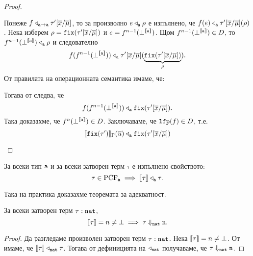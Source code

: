 \begin{proof}
\begin{itemize}
    Понеже $f \triangleleft_{\vv{a}\to\vv{a}} \tau'[\ov{x}/\ov{\mu}]$, то
    за произволно $e \triangleleft_{\vv{a}} \rho$ е изпълнено, че
    $f(e) \triangleleft_{\vv{a}} \tau'[\ov{x}/\ov{\mu}](\rho)$.
    Нека изберем $\rho = \fix(\tau'[\ov{x}/\ov{\mu}])$ и $e = f^{n-1}(\bot^{\val{\vv{a}}})$.
    Щом $f^{n-1}(\bot^{\val{\vv{a}}}) \in D$, то $f^{n-1}(\bot^{\val{\vv{a}}}) \triangleleft_{\vv{a}} \rho$ и следователно
    \[f(f^{n-1}(\bot^{\val{\vv{a}}})) \triangleleft_{\vv{a}} \tau'[\ov{x}/\ov{\mu}](\underbrace{\fix(\tau'[\ov{x}/\ov{\mu}])}_{\rho}).\]
    От правилата на операционната семантика имаме, че:
    \begin{prooftree}
    \end{prooftree}
    Тогава от  следва, че
    \[f(f^{n-1}(\bot^{\val{\vv{a}}})) \triangleleft_{\vv{a}} \fix(\tau'[\ov{x}/\ov{\mu}]).\]
    Така доказахме, че $f^n(\bot^{\val{\vv{a}}}) \in D$.
    Заключаваме, че $\lfp(f) \in D$, т.е.
    \[\val{\fix(\tau')}_\Gamma(\ov{u}) \triangleleft_{\vv{a}} \fix(\tau'[\ov{x}/\ov{\mu}])\]
  \end{itemize}
\end{proof}

\begin{corollary}\label{cr:pcf:fundamental}
  За всеки тип $\vv{a}$ и за всеки затворен терм $\tau$ е изпълнено свойството:
  \[\tau \in \text{PCF}_{\vv{a}} \implies \val{\tau} \triangleleft_{\vv{a}} \tau.\]
\end{corollary}

Така на практика доказахме теоремата за адекватност.

\begin{framed}
  \begin{theorem}\label{th:pcf:adequacy}
    За всеки затворен терм $\tau : \vv{nat}$, 
    \[\val{\tau} = n \neq \bot \implies \tau \Downarrow_{\vv{nat}} \vv{n}.\]
  \end{theorem}
\end{framed}
\begin{proof}
  Да разгледаме произволен затворен терм $\tau : \vv{nat}$.
  Нека $\val{\tau} = n \neq \bot$.
  От  имаме, че $\val{\tau} \triangleleft_{\vv{nat}} \tau$.
  Тогава от дефиницията на $\triangleleft_{\vv{nat}}$ получаваме, че $\tau \Downarrow_{\vv{nat}} \vv{n}$.
\end{proof}


